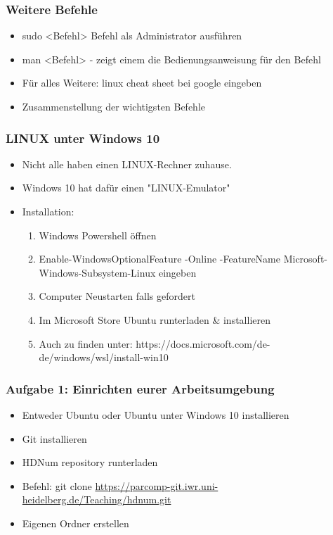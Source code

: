 \begin{frame}
\frametitle{Weitere Befehle}
\begin{itemize}
\item sudo <Befehl> Befehl als Administrator ausführen
\item man <Befehl> - zeigt einem die Bedienungsanweisung für den Befehl
\item Für alles Weitere: linux cheat sheet bei google eingeben
\item Zusammenstellung der wichtigsten Befehle
\end{itemize}
\end{frame}


\begin{frame}[fragile]
\frametitle{LINUX unter Windows 10}
\begin{itemize}
\item Nicht alle haben einen LINUX-Rechner zuhause.
\item Windows 10 hat dafür einen "LINUX-Emulator"
\item Installation:
\begin{enumerate} 
\item Windows Powershell öffnen
\item Enable-WindowsOptionalFeature -Online -FeatureName Microsoft-Windows-Subsystem-Linux eingeben
\item Computer Neustarten falls gefordert
\item Im Microsoft Store Ubuntu runterladen \& installieren
\item Auch zu finden unter: https://docs.microsoft.com/de-de/windows/wsl/install-win10
\end{enumerate}
\end{itemize}
\end{frame}


\begin{frame}[fragile]
\frametitle{Aufgabe 1: Einrichten eurer Arbeitsumgebung}
\begin{itemize}
\item Entweder Ubuntu oder Ubuntu unter Windows 10 installieren
\item Git installieren
\item HDNum repository runterladen
\item Befehl: git clone \url{https://parcomp-git.iwr.uni-heidelberg.de/Teaching/hdnum.git}
\item Eigenen Ordner erstellen
\end{itemize}
\end{frame}